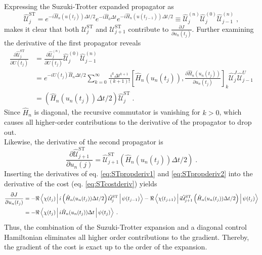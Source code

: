 \documentclass[%
 reprint,
 amsmath,amssymb,
 aps,
pra,
]{revtex4-1}
\begin{document}
Expressing the Suzuki-Trotter expanded propagator as
\begin{equation}
	\hat{\mathcal{U}}_{j}^{\mathrm{ST}} = e^{ -i  \hat{H}_n (u (t_j)) \Delta t /2 } e^{ -i \hat{H}_0 \Delta t } e^{ -i  \hat{H}_n (u (t_{j-1}))  \Delta t /2 }  \equiv \hat{\mathcal{U}}_{j}^{(n)} \hat{\mathcal{U}}_{j}^{(0)} \hat{\mathcal{U}}_{j-1}^{(n)} \; , 
\end{equation}
makes it clear that both $\mathcal{U}_{j}^{\mathrm{ST}}$ and $\mathcal{U}_{j+1}^{\mathrm{ST}}$ contribute to $\frac{\partial J}{\partial u_n (t_j)}$.
Further examining the derivative of the first propagator reveals
\begin{align}
	\frac{\partial \hat{\mathcal{U}}_{j}^{\mathrm{ST}}}{\partial U (t_j)} &=  \frac{\partial \hat{\mathcal{U}}_{j}^{(n)}}{\partial U (t_j)} \hat{\mathcal{U}}_{j}^{(0)} \hat{\mathcal{U}}_{j-1}^{(n)} \nonumber \\
	&=  e^{ -i U (t_j) \hat{H}_n  \Delta t /2 }  \sum_{k = 0}^{\infty }  \frac{i^k \Delta t^{k+1}}{(k+1)!} \left[ \hat{H}_n (u_n (t_j))  ,  \frac{\partial \hat{H}_n (u_n (t_j))}{\partial u_n (t_j)} \right]_k \hat{\mathcal{U}}_{j}^{J} \hat{\mathcal{U}}_{j-1}^{U} \nonumber \\
	&= \left(  \hat{H}_n (u_n (t_j)) \Delta t /2 \right) \hat{\mathcal{U}}_{j}^{\mathrm{ST}} \; . \label{eq:STpropderiv1}
\end{align}
Since $\hat{H}_n$ is diagonal, the recursive commutator is vanishing for $k > 0$, which causes all higher-order contributions to the derivative of the propagator to drop out.\\
Likewise, the derivative of the second propagator is
\begin{equation}
	\frac{\partial \hat{\mathcal{U}}_{j+1}^{\mathrm{ST}}}{\partial u_n (j)} =  \hat{\mathcal{U}}_{j+1}^{\mathrm{ST}} \left(  \hat{H}_n (u_n (t_j)) \Delta t /2 \right) \; . \label{eq:STpropderiv2}
\end{equation}
Inserting the derivatives of eq. \eqref{eq:STpropderiv1} and \eqref{eq:STpropderiv2} into the derivative of the cost (eq. \eqref{eq:STcostderiv}) yields
\begin{align}
	\frac{\partial J}{\partial u_n (t_j)} &= - \Re \Braket{\chi (t_j) | i  \left(  \hat{H}_n (u_n (t_j)) \Delta t /2 \right) \hat{\mathcal{U}}_{j}^{\mathrm{ST}} | \psi (t_{j-1})} - \Re \Braket{\chi (t_{j+1}) | i \hat{\mathcal{U}}_{j+1}^{\mathrm{ST}} \left(  \hat{H}_n (u_n (t_j)) \Delta t /2 \right) | \psi (t_{j})} \nonumber \\
	&= - \Re \Braket{\chi (t_j) | i \hat{H}_n (u_n (t_j)) \Delta t | \psi (t_{j})} \; . \label{eq:STcostgrad}
\end{align}  
Thus, the combination of the Suzuki-Trotter expansion and a diagonal control Hamiltonian eliminates all higher order contributions to the gradient. Thereby, the gradient of the cost is exact up to the order of the expansion.
\end{document}
